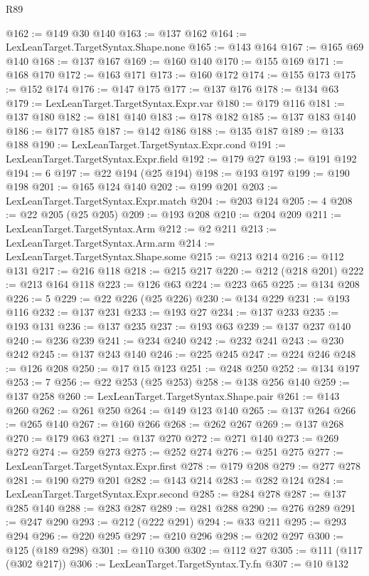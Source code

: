 \begin{lexlean}{R89}
\begin{coremodule}
@162 := @149 @30 @140
@163 := @137 @162
@164 := LexLeanTarget.TargetSyntax.Shape.none
@165 := @143 @164
@167 := @165 @69 @140
@168 := @137 @167
@169 := @160 @140
@170 := @155 @169
@171 := @168 @170
@172 := @163 @171
@173 := @160 @172
@174 := @155 @173
@175 := @152 @174
@176 := @147 @175
@177 := @137 @176
@178 := @134 @63
@179 := LexLeanTarget.TargetSyntax.Expr.var
@180 := @179 @116
@181 := @137 @180
@182 := @181 @140
@183 := @178 @182
@185 := @137 @183 @140
@186 := @177 @185
@187 := @142 @186
@188 := @135 @187
@189 := @133 @188
@190 := LexLeanTarget.TargetSyntax.Expr.cond
@191 := LexLeanTarget.TargetSyntax.Expr.field
@192 := @179 @27
@193 := @191 @192
@194 := 6
@197 := @22 @194 (@25 @194)
@198 := @193 @197
@199 := @190 @198
@201 := @165 @124 @140
@202 := @199 @201
@203 := LexLeanTarget.TargetSyntax.Expr.match
@204 := @203 @124
@205 := 4
@208 := @22 @205 (@25 @205)
@209 := @193 @208
@210 := @204 @209
@211 := LexLeanTarget.TargetSyntax.Arm
@212 := @2 @211
@213 := LexLeanTarget.TargetSyntax.Arm.arm
@214 := LexLeanTarget.TargetSyntax.Shape.some
@215 := @213 @214
@216 := @112 @131
@217 := @216 @118
@218 := @215 @217
@220 := @212 (@218 @201)
@222 := @213 @164 @118
@223 := @126 @63
@224 := @223 @65
@225 := @134 @208
@226 := 5
@229 := @22 @226 (@25 @226)
@230 := @134 @229
@231 := @193 @116
@232 := @137 @231
@233 := @193 @27
@234 := @137 @233
@235 := @193 @131
@236 := @137 @235
@237 := @193 @63
@239 := @137 @237 @140
@240 := @236 @239
@241 := @234 @240
@242 := @232 @241
@243 := @230 @242
@245 := @137 @243 @140
@246 := @225 @245
@247 := @224 @246
@248 := @126 @208
@250 := @17 @15 @123
@251 := @248 @250
@252 := @134 @197
@253 := 7
@256 := @22 @253 (@25 @253)
@258 := @138 @256 @140
@259 := @137 @258
@260 := LexLeanTarget.TargetSyntax.Shape.pair
@261 := @143 @260
@262 := @261 @250
@264 := @149 @123 @140
@265 := @137 @264
@266 := @265 @140
@267 := @160 @266
@268 := @262 @267
@269 := @137 @268
@270 := @179 @63
@271 := @137 @270
@272 := @271 @140
@273 := @269 @272
@274 := @259 @273
@275 := @252 @274
@276 := @251 @275
@277 := LexLeanTarget.TargetSyntax.Expr.first
@278 := @179 @208
@279 := @277 @278
@281 := @190 @279 @201
@282 := @143 @214
@283 := @282 @124
@284 := LexLeanTarget.TargetSyntax.Expr.second
@285 := @284 @278
@287 := @137 @285 @140
@288 := @283 @287
@289 := @281 @288
@290 := @276 @289
@291 := @247 @290
@293 := @212 (@222 @291)
@294 := @33 @211
@295 := @293 @294
@296 := @220 @295
@297 := @210 @296
@298 := @202 @297
@300 := @125 (@189 @298)
@301 := @110 @300
@302 := @112 @27
@305 := @111 (@117 (@302 @217))
@306 := LexLeanTarget.TargetSyntax.Ty.fn
@307 := @10 @132

\end{coremodule}
\end{lexlean}
